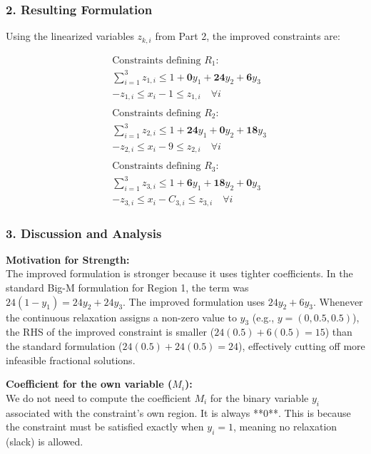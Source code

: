 \documentclass{article} %
\begin{document}
    \subsubsection*{2. Resulting Formulation}
    Using the linearized variables $z_{k,i}$ from Part 2, the improved constraints are:

    \[
    \begin{aligned}
        & \text{Constraints defining } R_1: \\
        & \sum_{i=1}^3 z_{1,i} \leq 1 + \mathbf{0}y_1 + \mathbf{24}y_2 + \mathbf{6}y_3 \\
        & -z_{1,i} \leq x_i - 1 \leq z_{1,i} \quad \forall i \\
        \\
        & \text{Constraints defining } R_2: \\
        & \sum_{i=1}^3 z_{2,i} \leq 1 + \mathbf{24}y_1 + \mathbf{0}y_2 + \mathbf{18}y_3 \\
        & -z_{2,i} \leq x_i - 9 \leq z_{2,i} \quad \forall i \\
        \\
        & \text{Constraints defining } R_3: \\
        & \sum_{i=1}^3 z_{3,i} \leq 1 + \mathbf{6}y_1 + \mathbf{18}y_2 + \mathbf{0}y_3 \\
        & -z_{3,i} \leq x_i - C_{3,i} \leq z_{3,i} \quad \forall i
    \end{aligned}
    \]

        \subsubsection*{3. Discussion and Analysis}

        \textbf{Motivation for Strength:} \\
        The improved formulation is stronger because it uses tighter coefficients. In the standard Big-M formulation for Region 1, the term was $24(1-y_1) = 24y_2 + 24y_3$. The improved formulation uses $24y_2 + 6y_3$. Whenever the continuous relaxation assigns a non-zero value to $y_3$ (e.g., $y = (0, 0.5, 0.5)$), the RHS of the improved constraint is smaller ($24(0.5) + 6(0.5) = 15$) than the standard formulation ($24(0.5) + 24(0.5) = 24$), effectively cutting off more infeasible fractional solutions.

        \textbf{Coefficient for the own variable ($M_i$):} \\
        We do not need to compute the coefficient $M_i$ for the binary variable $y_i$ associated with the constraint's own region. It is always **0**. This is because the constraint must be satisfied exactly when $y_i=1$, meaning no relaxation (slack) is allowed.
\end{document}
